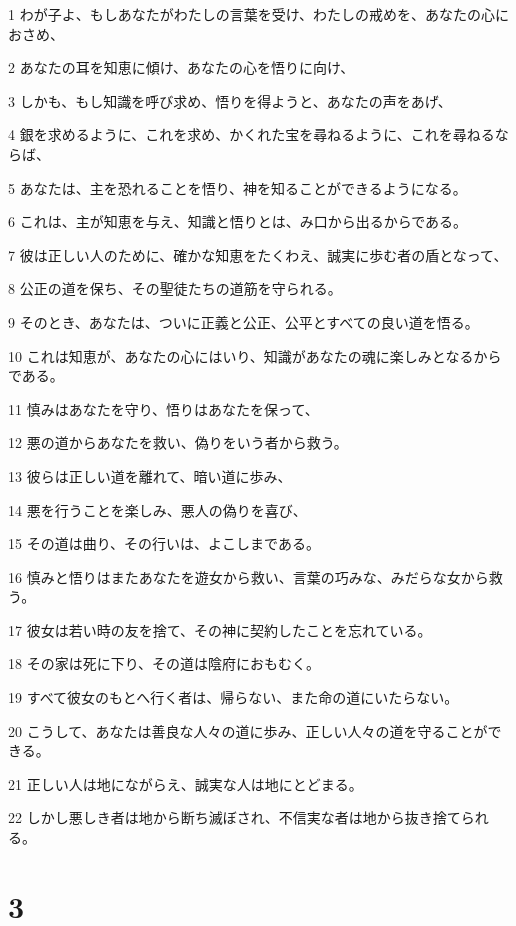 \par 1 わが子よ、もしあなたがわたしの言葉を受け、わたしの戒めを、あなたの心におさめ、
\par 2 あなたの耳を知恵に傾け、あなたの心を悟りに向け、
\par 3 しかも、もし知識を呼び求め、悟りを得ようと、あなたの声をあげ、
\par 4 銀を求めるように、これを求め、かくれた宝を尋ねるように、これを尋ねるならば、
\par 5 あなたは、主を恐れることを悟り、神を知ることができるようになる。
\par 6 これは、主が知恵を与え、知識と悟りとは、み口から出るからである。
\par 7 彼は正しい人のために、確かな知恵をたくわえ、誠実に歩む者の盾となって、
\par 8 公正の道を保ち、その聖徒たちの道筋を守られる。
\par 9 そのとき、あなたは、ついに正義と公正、公平とすべての良い道を悟る。
\par 10 これは知恵が、あなたの心にはいり、知識があなたの魂に楽しみとなるからである。
\par 11 慎みはあなたを守り、悟りはあなたを保って、
\par 12 悪の道からあなたを救い、偽りをいう者から救う。
\par 13 彼らは正しい道を離れて、暗い道に歩み、
\par 14 悪を行うことを楽しみ、悪人の偽りを喜び、
\par 15 その道は曲り、その行いは、よこしまである。
\par 16 慎みと悟りはまたあなたを遊女から救い、言葉の巧みな、みだらな女から救う。
\par 17 彼女は若い時の友を捨て、その神に契約したことを忘れている。
\par 18 その家は死に下り、その道は陰府におもむく。
\par 19 すべて彼女のもとへ行く者は、帰らない、また命の道にいたらない。
\par 20 こうして、あなたは善良な人々の道に歩み、正しい人々の道を守ることができる。
\par 21 正しい人は地にながらえ、誠実な人は地にとどまる。
\par 22 しかし悪しき者は地から断ち滅ぼされ、不信実な者は地から抜き捨てられる。

\chapter{3}

